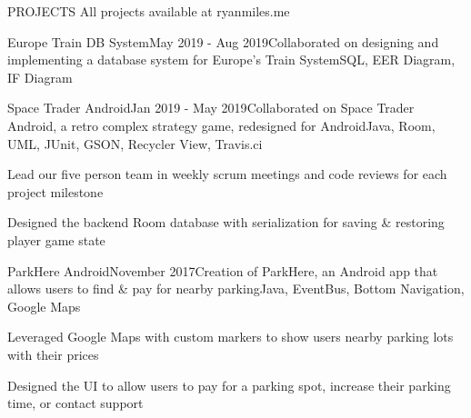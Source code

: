 \documentclass{resume} %
\begin{document}
\begin{rSectionProjects}{PROJECTS} {All projects available at ryanmiles.me}
\begin{rSubsectionProjects}{Europe Train DB System}{May 2019 - Aug 2019}{Collaborated on designing and implementing a database system for Europe's Train System}{SQL, EER Diagram, IF Diagram} {}
\end{rSubsectionProjects} 


\begin{rSubsectionProjects}{Space Trader Android}{Jan 2019 - May 2019}{Collaborated on Space Trader Android, a retro complex strategy game, redesigned for Android}{Java, Room, UML, JUnit, GSON, Recycler View, Travis.ci} {}
	\item Lead our five person team in weekly scrum meetings and code reviews for each project milestone
	\item Designed the backend Room database with serialization for saving \& restoring player game state
	
\end{rSubsectionProjects} 

\begin{rSubsectionProjects}{ParkHere Android}{November 2017}{Creation of ParkHere, an Android app that allows users to find \& pay for nearby parking}{Java, EventBus, Bottom Navigation, Google Maps}{}
	\item Leveraged Google Maps with custom markers to show users nearby parking lots with their prices
	\item Designed the UI to allow users to pay for a parking spot, increase their parking time, or contact support
	
\end{rSubsectionProjects} 


\end{rSectionProjects} 
\end{document}
